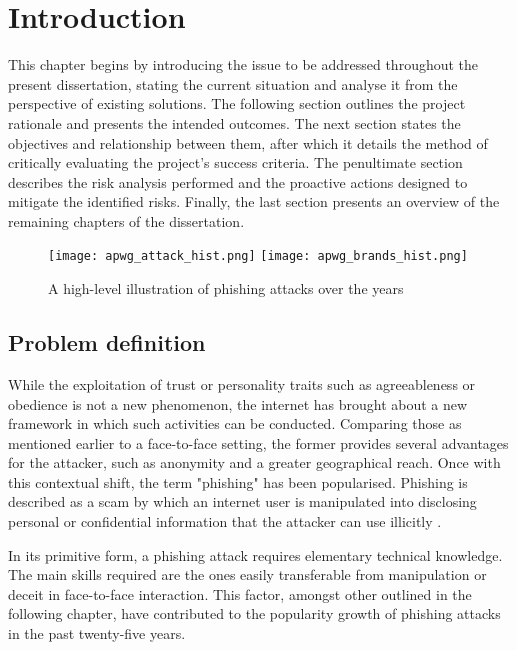 
\chapter{Introduction}
\label{chap:introduction}
This chapter begins by introducing the issue to be addressed throughout the present dissertation, stating the current situation and analyse it from the perspective of existing solutions. The following section outlines the project rationale and presents the intended outcomes. The next section states the objectives and relationship between them, after which it details the method of critically evaluating the project's success criteria. The penultimate section describes the risk analysis performed and the proactive actions designed to mitigate the identified risks. Finally, the last section presents an overview of the remaining chapters of the dissertation.

\begin{figure}[b]
	\centering
	\texttt{[image: apwg\_attack\_hist.png]}
	\texttt{[image: apwg\_brands\_hist.png]}
	\caption{A high-level illustration of phishing attacks over the years}
	\label{fig:PHISHING_HISTORY}
\end{figure}

\section{Problem definition}
\label{sec:problem_definition}
While the exploitation of trust or personality traits such as agreeableness or obedience is not a new phenomenon, the internet has brought about a new framework in which such activities can be conducted. Comparing those as mentioned earlier to a face-to-face setting, the former provides several advantages for the attacker, such as anonymity and a greater geographical reach. Once with this contextual shift, the term "phishing" has been popularised. Phishing is described as a scam by which an internet user is manipulated into disclosing personal or confidential information that the attacker can use illicitly \citep{Merriam_Webster}.

In its primitive form, a phishing attack requires elementary technical knowledge. The main skills required are the ones easily transferable from manipulation or deceit in face-to-face interaction. This factor, amongst other outlined in the following chapter, have contributed to the popularity growth of phishing attacks in the past twenty-five years.

